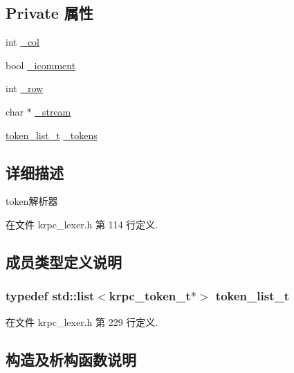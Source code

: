 \subsection*{Private 属性}
\begin{DoxyCompactItemize}
\item 
int \hyperlink{classkrpc__lexer__t_a01ae7de0d6a18d91fa340cfa16a3e29e}{\+\_\+col}
\item 
bool \hyperlink{classkrpc__lexer__t_a1dff5704d4f4cf03e612b387f2e0e8f3}{\+\_\+icomment}
\item 
int \hyperlink{classkrpc__lexer__t_a2c788815cbc67c3734ad77878c81dda8}{\+\_\+row}
\item 
char $\ast$ \hyperlink{classkrpc__lexer__t_a20b4eb27ad7e1ff727fdb2e25d7fd04a}{\+\_\+stream}
\item 
\hyperlink{classkrpc__lexer__t_ad8bdce05269a6b358903a11c1e09d6ac}{token\+\_\+list\+\_\+t} \hyperlink{classkrpc__lexer__t_aaf4e19b186e6ebcb707160ec088ac91c}{\+\_\+tokens}
\end{DoxyCompactItemize}


\subsection{详细描述}
token解析器 

在文件 krpc\+\_\+lexer.\+h 第 114 行定义.



\subsection{成员类型定义说明}
\hypertarget{classkrpc__lexer__t_ad8bdce05269a6b358903a11c1e09d6ac}{}
\subsubsection[{token\+\_\+list\+\_\+t}]{\setlength{\rightskip}{0pt plus 5cm}typedef std\+::list$<${\bf krpc\+\_\+token\+\_\+t}$\ast$$>$ {\bf token\+\_\+list\+\_\+t}\hspace{0.3cm}{\ttfamily [private]}}\label{classkrpc__lexer__t_ad8bdce05269a6b358903a11c1e09d6ac}


在文件 krpc\+\_\+lexer.\+h 第 229 行定义.



\subsection{构造及析构函数说明}
\hypertarget{classkrpc__lexer__t_aef965ee4139d9bd6b0db053627a2e52d}{}
